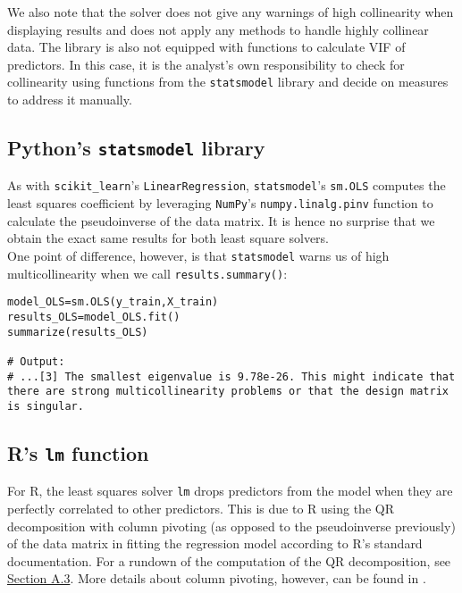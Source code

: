 \documentclass[12pt]{article}
\begin{document}
	We also note that the solver does not give any warnings of high collinearity when displaying results and does not apply any methods to handle highly collinear data. The library is also not equipped with functions to calculate VIF of predictors. In this case, it is the analyst's own responsibility to check for collinearity using functions from the \texttt{statsmodel} library and decide on measures to address it manually.
	
	\subsection{Python's \texttt{statsmodel} library}
	
	As with \texttt{scikit\_learn}'s \texttt{LinearRegression}, \texttt{statsmodel}'s \texttt{sm.OLS} computes the least squares coefficient by leveraging \texttt{NumPy}'s \texttt{numpy.linalg.pinv} function to calculate the pseudoinverse of the data matrix. It is hence no surprise that we obtain the exact same results for both least square solvers. \\
	
	One point of difference, however, is that \texttt{statsmodel} warns us of high multicollinearity when we call \texttt{results.summary()}: \\
	
	\begin{lstlisting}
model_OLS=sm.OLS(y_train,X_train)
results_OLS=model_OLS.fit()
summarize(results_OLS)

# Output:
# ...[3] The smallest eigenvalue is 9.78e-26. This might indicate that there are strong multicollinearity problems or that the design matrix is singular.
	\end{lstlisting}

	\subsection{R's \texttt{lm} function}
	For R, the least squares solver \texttt{lm} drops predictors from the model when they are perfectly correlated to other predictors. This is due to R using the QR decomposition with column pivoting (as opposed to the pseudoinverse previously) of the data matrix in fitting the regression model according to R's standard documentation. For a rundown of the computation of the QR decomposition, see \hyperref[sec:qr]{Section A.3}. More details about column pivoting, however, can be found in \cite{CHAN198767}.\\
	
\end{document}
